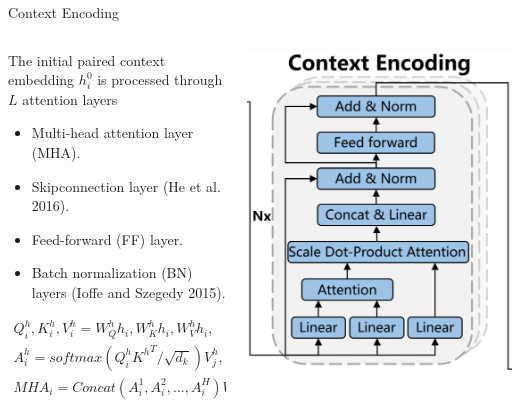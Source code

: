 \documentclass{beamer}
\begin{document}
\begin{frame}{Context Encoding}
	\begin{columns}
		\begin{column}{0.6\textwidth}
			\footnotesize
			The initial paired context embedding $h^0_i$ is processed through $L$ attention layers
			\begin{itemize}
				\item Multi-head attention layer (MHA).
				\item Skipconnection layer (He et al. 2016).
				\item Feed-forward (FF) layer.
				\item Batch normalization (BN) layers (Ioffe and Szegedy 2015).
			\end{itemize}
			\begin{align}
				Q_i^h,K_i^h,V_i^h=W_Q^hh_i,W_K^hh_i,W_V^hh_i, \\
				A_i^h=softmax(Q_i^h{K^h}^T/\sqrt{d_k})V_j^h,  \\
				MHA_i=Concat(A_i^1,A_i^2,...,A_i^H)W_O,
			\end{align}
		\end{column}
		\begin{column}{0.4\textwidth}
			\centering
			\includegraphics[width=\textwidth]{CE.png} %
		\end{column}
	\end{columns}
\end{frame}
\end{document}
